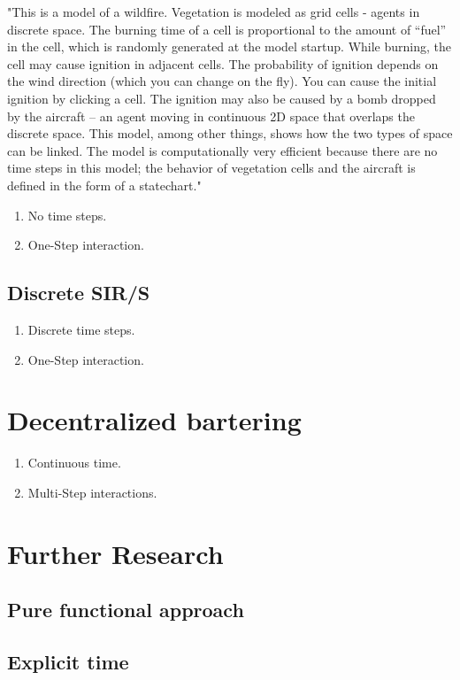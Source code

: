 \documentclass{article}
\begin{document}
"This is a model of a wildfire. Vegetation is modeled as grid cells - agents in discrete space. The burning time of a cell is proportional to the amount of “fuel” in the cell, which is randomly generated at the model startup. While burning, the cell may cause ignition in adjacent cells. The probability of ignition depends on the wind direction (which you can change on the fly). You can cause the initial ignition by clicking a cell. The ignition may also be caused by a bomb dropped by the aircraft – an agent moving in continuous 2D space that overlaps the discrete space. This model, among other things, shows how the two types of space can be linked. The model is computationally very efficient because there are no time steps in this model; the behavior of vegetation cells and the aircraft is defined in the form of a statechart."

\begin{enumerate}
\item No time steps.
\item One-Step interaction.
\end{enumerate}

\subsection{Discrete SIR/S}
\begin{enumerate}
\item Discrete time steps.
\item One-Step interaction.
\end{enumerate}

\section{Decentralized bartering}

\begin{enumerate}
\item Continuous time.
\item Multi-Step interactions.
\end{enumerate}

\section{Further Research}
\subsection{Pure functional approach}
\subsection{Explicit time}
\end{document}

